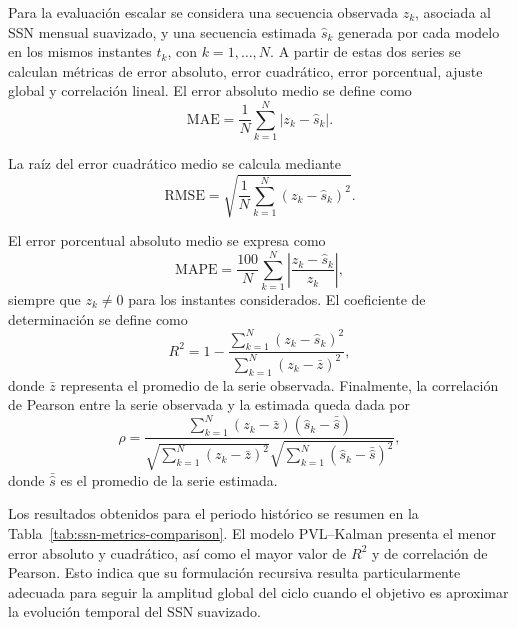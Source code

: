Para la evaluación escalar se considera una secuencia observada $z_k$, asociada al SSN mensual suavizado, y una secuencia estimada $\widehat{s}_k$ generada por cada modelo en los mismos instantes $t_k$, con $k=1,\ldots,N$. A partir de estas dos series se calculan métricas de error absoluto, error cuadrático, error porcentual, ajuste global y correlación lineal. El error absoluto medio se define como
\begin{equation}
\mathrm{MAE}=\frac{1}{N}\sum_{k=1}^{N}\left|z_k-\widehat{s}_k\right|.
\end{equation}

La raíz del error cuadrático medio se calcula mediante
\begin{equation}
\mathrm{RMSE}=\sqrt{\frac{1}{N}\sum_{k=1}^{N}\left(z_k-\widehat{s}_k\right)^2}.
\end{equation}

El error porcentual absoluto medio se expresa como
\begin{equation}
\mathrm{MAPE}=\frac{100}{N}\sum_{k=1}^{N}\left|\frac{z_k-\widehat{s}_k}{z_k}\right|,
\end{equation}
siempre que $z_k\neq 0$ para los instantes considerados. El coeficiente de determinación se define como
\begin{equation}
R^2=1-\frac{\sum_{k=1}^{N}\left(z_k-\widehat{s}_k\right)^2}{\sum_{k=1}^{N}\left(z_k-\bar{z}\right)^2},
\end{equation}
donde $\bar{z}$ representa el promedio de la serie observada. Finalmente, la correlación de Pearson entre la serie observada y la estimada queda dada por
\begin{equation}
\rho=\frac{\sum_{k=1}^{N}\left(z_k-\bar{z}\right)\left(\widehat{s}_k-\bar{\widehat{s}}\right)}{\sqrt{\sum_{k=1}^{N}\left(z_k-\bar{z}\right)^2}\sqrt{\sum_{k=1}^{N}\left(\widehat{s}_k-\bar{\widehat{s}}\right)^2}},
\end{equation}
donde $\bar{\widehat{s}}$ es el promedio de la serie estimada.

Los resultados obtenidos para el periodo histórico se resumen en la Tabla~\ref{tab:ssn-metrics-comparison}. El modelo PVL--Kalman presenta el menor error absoluto y cuadrático, así como el mayor valor de $R^2$ y de correlación de Pearson. Esto indica que su formulación recursiva resulta particularmente adecuada para seguir la amplitud global del ciclo cuando el objetivo es aproximar la evolución temporal del SSN suavizado.

